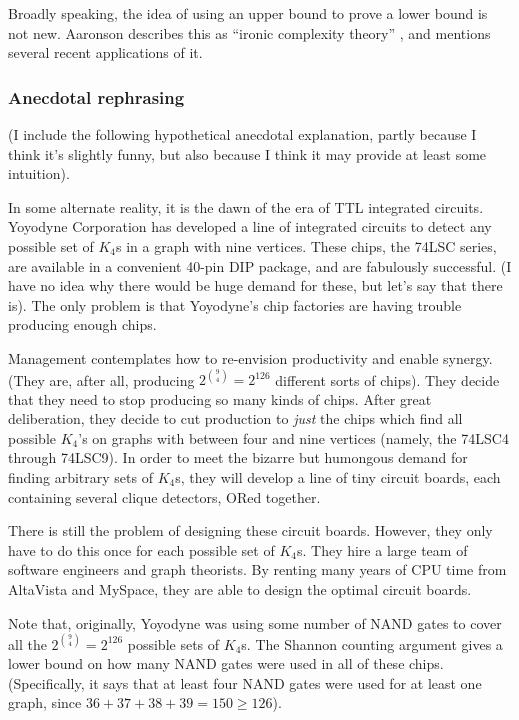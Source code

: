\documentclass[12pt]{article}
\theoremstyle{definition}
\begin{document}
Broadly speaking, the idea of using an upper bound to prove a lower bound
is not new. Aaronson describes this as ``ironic complexity theory''
\cite{aaronson_pnp}, and mentions several recent applications of it.

\subsubsection{Anecdotal rephrasing}

(I include the following hypothetical anecdotal explanation,
partly because I think it's slightly funny, but also because I think it may
provide at least some intuition).

In some alternate reality, it is the dawn of the era of 
TTL integrated circuits.
Yoyodyne Corporation has developed a line of integrated circuits to detect
any possible set of $K_4$s in a graph with nine vertices.
These chips, the 74LSC series,
are available in a convenient 40-pin DIP package, and are
fabulously successful. (I have no idea why there would be huge demand for
these, but let's say that there is). The only problem is that Yoyodyne's 
chip factories are having trouble producing enough chips.

Management contemplates how to re-envision productivity and enable
synergy. (They are, after all, producing $2^{9 \choose 4} = 2^{126}$
different sorts of chips).
They decide that they need to stop producing so many kinds of chips.
After great deliberation, they decide to cut production to {\em just} the
chips which find all possible
$K_4$'s on graphs with between four and nine vertices (namely, the 74LSC4
through 74LSC9). In order to meet the bizarre but humongous
demand for finding arbitrary sets of $K_4$s, they will develop a
line of tiny circuit boards,
each containing several clique detectors, ORed together.

There is still the problem of designing these circuit boards. However,
they only have to do this once for each possible set of $K_4$s. They hire
a large team of software engineers and graph theorists. By renting
many years of CPU time from AltaVista and MySpace, they are able to design the
optimal circuit boards.

Note that, originally, Yoyodyne was using some number of NAND gates to
cover all the $2^{9 \choose 4} = 2^{126}$ possible sets of $K_4$s.
The Shannon counting
argument gives a lower bound on how many NAND gates were used in all of
these chips. (Specifically, it says that at least four NAND gates
were used for at least one graph, since $36+37+38+39 = 150 \ge 126$).
\end{document}
